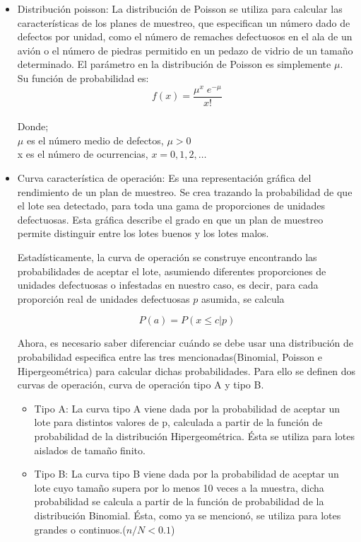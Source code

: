 \begin{itemize}
\item Distribuci\'{o}n poisson: La distribuci\'{o}n de Poisson se utiliza para calcular las caracter\'{i}sticas de los planes de muestreo, que especifican un n\'{u}mero dado de defectos por unidad, como el n\'{u}mero de remaches defectuosos en el ala de un avi\'{o}n o el n\'{u}mero de piedras permitido en un pedazo de vidrio de un tama\~{n}o determinado. El par\'{a}metro en la distribuci\'{o}n de Poisson es simplemente $\mu$. Su funci\'{o}n de probabilidad es:
$$f(x)=\frac{{\mu}^x \; e^{-\mu}}{x!}$$
~\\ Donde; 
~\\ $\mu$ es el n\'{u}mero medio de defectos, $\mu>0$
~\\ x es el n\'{u}mero de ocurrencias, $x=0,1,2,\dots$

\item Curva caracter\'{i}stica de operaci\'{o}n: Es una representaci\'{o}n gr\'{a}fica del rendimiento de un plan de muestreo. Se crea trazando la probabilidad de que el lote sea detectado, para toda una gama de proporciones de unidades defectuosas. Esta gr\'{a}fica describe el grado en que un plan de muestreo permite distinguir entre los lotes buenos y los lotes malos. \cite{OPE} 

Estad\'{i}sticamente, la curva de operaci\'{o}n se construye encontrando las probabilidades de aceptar el lote, asumiendo diferentes proporciones de unidades defectuosas o infestadas en nuestro caso, es decir, para cada proporci\'{o}n real de unidades defectuosas $p$ asumida, se calcula

$$P(a)=P(x\leq c | p)$$

Ahora, es necesario saber diferenciar cu\'{a}ndo se debe usar una distribuci\'{o}n de probabilidad especifica entre las tres mencionadas(Binomial, Poisson e Hipergeom\'{e}trica) para calcular dichas probabilidades. Para ello se definen dos curvas de operaci\'{o}n, curva de operaci\'{o}n tipo A y tipo B.
\begin{itemize}
\item Tipo A: La curva tipo A viene dada por la probabilidad de aceptar un lote para distintos valores de p, calculada a partir de la funci\'{o}n de probabilidad de la distribuci\'{o}n Hipergeom\'{e}trica. \'{E}sta se utiliza para lotes aislados de tama\~{n}o finito.
\item Tipo B: La curva tipo B viene dada por la probabilidad de aceptar un lote cuyo tama\~{n}o supera por lo menos 10 veces a la muestra, dicha probabilidad se calcula a partir de la funci\'{o}n de probabilidad de la distribuci\'{o}n Binomial. \'{E}sta, como ya se mencion\'{o}, se utiliza para lotes grandes o continuos.($n/N<0.1$)


\end{itemize}
\end{itemize}
